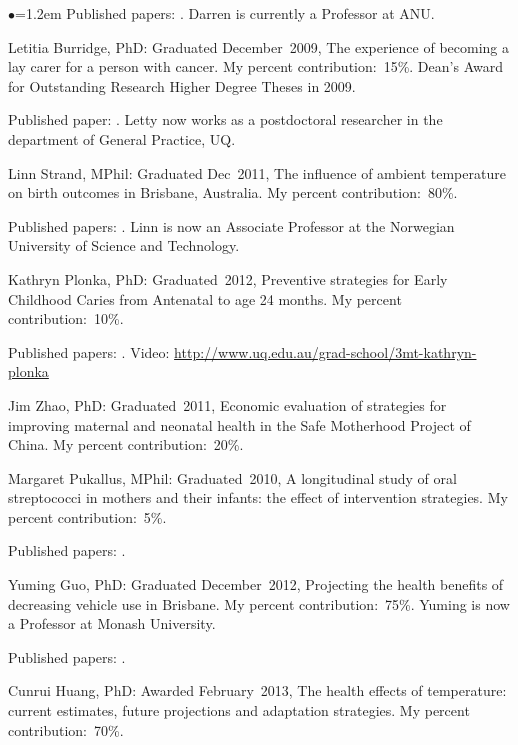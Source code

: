 \documentclass[a4paper,11pt]{article}
\renewcommand{\labelitemi}{$\bullet$}
\begin{document}
\begin{raggedright}
\begin{list}{\labelitemi}{\leftmargin=1.2em}
Published papers: . Darren is currently a Professor at ANU.

\item Letitia Burridge, PhD: Graduated December~2009, The experience of becoming a lay carer for a person with cancer. My percent contribution:~15\%. Dean's Award for Outstanding Research Higher Degree Theses in 2009.

Published paper: . Letty now works as a postdoctoral researcher in the department of General Practice, UQ.

\item Linn Strand, MPhil: Graduated Dec~2011, The influence of ambient temperature on birth outcomes in Brisbane, Australia. My percent contribution:~80\%.

Published papers: . Linn is now an Associate Professor at the Norwegian University of Science and Technology.

\item Kathryn Plonka, PhD: Graduated~2012, Preventive strategies for Early Childhood Caries from Antenatal to age 24 months. My percent contribution:~10\%.

Published papers: . Video: \url{http://www.uq.edu.au/grad-school/3mt-kathryn-plonka}

\item Jim Zhao, PhD: Graduated~2011, Economic evaluation of strategies for improving maternal and neonatal health in the Safe Motherhood Project of China. My percent contribution:~20\%.

\item Margaret Pukallus, MPhil: Graduated~2010, A longitudinal study of oral streptococci in mothers and their infants: the effect of intervention strategies. My percent contribution:~5\%.

Published papers: .

\item Yuming Guo, PhD: Graduated December~2012, Projecting the health benefits of decreasing vehicle use in Brisbane. My percent contribution:~75\%. Yuming is now a Professor at Monash University.

Published papers: . %

\item Cunrui Huang, PhD: Awarded February~2013, The health effects of temperature: current estimates, future projections and adaptation strategies. My percent contribution:~70\%.


\end{list}
\end{raggedright}
\end{document}
